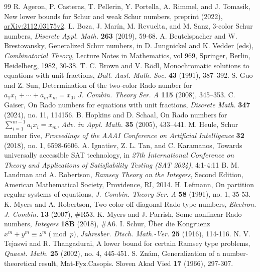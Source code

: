 \documentclass[10pt,a4paper]{amsart}
\begin{document}
\begin{thebibliography}{99}
 R. Ageron, P. Casteras, T. Pellerin, Y. Portella, A. Rimmel, and J. Tomasik, New lower bounds for Schur and weak Schur numbers, preprint (2022), \url{arXiv:2112.03175v2}.
 L. Boza, J. Mar\'{i}n, M. Revuelta, and M. Sanz, 3-color Schur numbers, \textit{Discrete Appl. Math.} \textbf{263} (2019), 59-68.
 A. Beutelspacher and W. Brestovansky, Generalized Schur numbers, in D. Jungnickel and K. Vedder (eds), \textit{Combinatorial Theory}, Lecture Notes in Mathematics, vol 969, Springer, Berlin, Heidelberg, 1982, 30-38.
 T. C. Brown and V. R\"{o}dl, Monochromatic solutions to equations with unit fractions, \textit{Bull. Aust. Math. Soc.} \textbf{43} (1991), 387–392.
 S. Guo and Z. Sun, Determination of the two-color Rado number for $a_1x_1+\cdots+a_mx_m=x_0$, \textit{J. Combin. Theory Ser. A } \textbf{115} (2008), 345–353.
 C. Gaiser, On Rado numbers for equations with unit fractions, \textit{Discrete Math.} \textbf{347} (2024), no. 11, 114156.
 B. Hopkins and D. Schaal, On Rado numbers for $\sum_{i=1}^{m-1}a_ix_i=x_m$, \textit{Adv. in Appl. Math.} \textbf{35} (2005), 433–441.
 M. Heule, Schur number five, \textit{Proceedings of the AAAI Conference on Artificial Intelligence} \textbf{32} (2018), no. 1, 6598-6606.
 A. Ignatiev, Z. L. Tan, and C. Karamanos, Towards universally accessible SAT technology, in \textit{27th International Conference on Theory and Applications of Satisfiability Testing (SAT 2024)}, 4:1-4:11
 B. M. Landman and A. Robertson, \textit{Ramsey Theory on the Integers}, Second Edition, American Mathematical Society, Providence, RI, 2014.
 H. Lefmann, On partition regular systems of equations, \textit{J. Combin. Theory Ser. A} \textbf{58} (1991), no. 1, 35-53.
 K. Myers and A. Robertson, Two color off-diagonal Rado-type numbers, \textit{Electron. J. Combin.} \textbf{13} (2007), \#R53.
 K. Myers and J. Parrish, Some nonlinear Rado numbers, \textit{Integers} \textbf{18B} (2018), \#A6.
 I. Schur, \"{U}ber die Kongruenz $x^m+y^m\equiv z^m\pmod p$, \textit{Jahresber. Dtsch. Math.-Ver.} \textbf{25} (1916), 114-116.
 N. V. Tejaswi and R. Thangadurai, A lower bound for certain Ramsey type problems, \textit{Quaest. Math.} \textbf{25} (2002), no. 4, 445-451.
 S. Zn\'{a}m, Generalization of a number-theoretical result, Mat-Fyz.Casopis. Sloven Akad Vied \textbf{17} (1966), 297-307.
\end{thebibliography}
\end{document}
